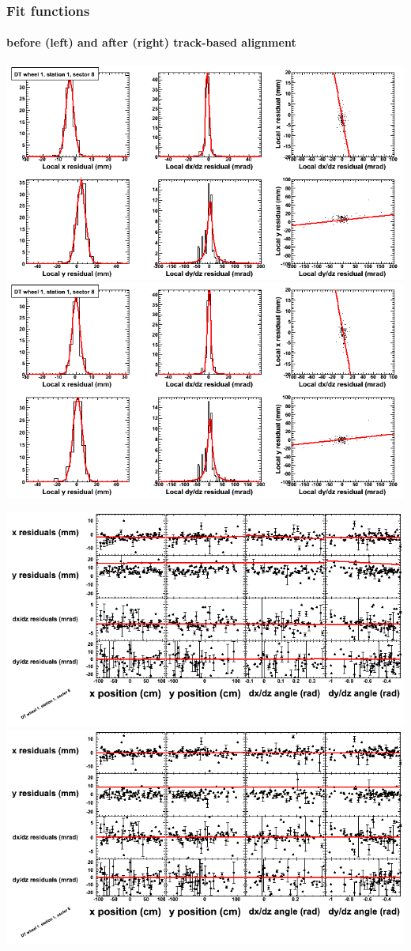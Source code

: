 \documentclass[compress]{beamer}
\begin{document}
\begin{frame}
\frametitle{Fit functions}
\framesubtitle{before (left) and after (right) track-based alignment}
\includegraphics[width=0.5\linewidth]{fitfunctions_re01/MBwhDst1sec08_bellcurves.png} \includegraphics[width=0.5\linewidth]{fitfunctions_re05/MBwhDst1sec08_bellcurves.png}

\includegraphics[width=0.5\linewidth]{fitfunctions_re01/MBwhDst1sec08_polynomials.png} \includegraphics[width=0.5\linewidth]{fitfunctions_re05/MBwhDst1sec08_polynomials.png}
\end{frame}
\end{document}
